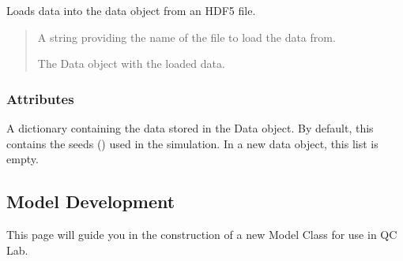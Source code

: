 \documentclass[letterpaper,10pt,english]{sphinxmanual}
\begin{document}

\begin{fulllineitems}
\label{\detokenize{user_guide/data_object:data.load_from_h5}}
\pysigstartsignatures
\pysiglinewithargsret
{}
{}
{}
\pysigstopsignatures
\sphinxAtStartPar
Loads data into the data object from an HDF5 file.
\begin{quote}\begin{description}
\sphinxAtStartPar
{} \textendash{} A string providing the name of the file to load the data from.

\sphinxAtStartPar
The Data object with the loaded data.

\end{description}\end{quote}

\end{fulllineitems}



\subsubsection{Attributes}
\label{\detokenize{user_guide/data_object:attributes}}

\begin{fulllineitems}
\label{\detokenize{user_guide/data_object:data.data_dic}}
\pysigstartsignatures
\pysigline
{}
\pysigstopsignatures
\sphinxAtStartPar
A dictionary containing the data stored in the Data object. By default, this contains the seeds
()
used in the simulation. In a new data object, this list is empty.

\end{fulllineitems}


\sphinxstepscope


\subsection{Model Development}
\label{\detokenize{user_guide/model_dev:model-development}}\label{\detokenize{user_guide/model_dev::doc}}
\sphinxAtStartPar
This page will guide you in the construction of a new Model Class for use in QC Lab.
\end{document}
